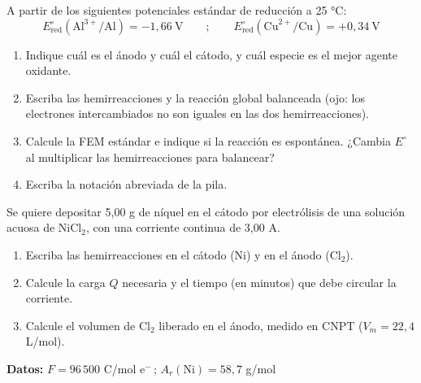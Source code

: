 \documentclass[11pt]{article}
\newcommand{\ejercicio}[1]{\par\vspace{10pt}{\large\bfseries\color{NavyBlue}Ejercicio #1}\par
  \nointerlineskip\vspace{2pt}{\color{NavyBlue!40}\rule{\linewidth}{0.4pt}}\par\vspace{2pt}}
\begin{document}
\ejercicio{6}
A partir de los siguientes potenciales estándar de reducción a 25 °C:
\[E^\circ_{\text{red}}(\text{Al}^{3+}/\text{Al}) = -1{,}66\ \text{V} \qquad ; \qquad E^\circ_{\text{red}}(\text{Cu}^{2+}/\text{Cu}) = +0{,}34\ \text{V}\]
\begin{enumerate}
\item Indique cuál es el ánodo y cuál el cátodo, y cuál especie es el mejor agente oxidante.
\item Escriba las hemirreacciones y la reacción global balanceada (ojo: los electrones intercambiados no son iguales en las dos hemirreacciones).
\item Calcule la FEM estándar e indique si la reacción es espontánea. ¿Cambia \(E^\circ\) al multiplicar las hemirreacciones para balancear?
\item Escriba la notación abreviada de la pila.
\end{enumerate}

\ejercicio{7}
Se quiere depositar 5,00 g de níquel en el cátodo por electrólisis de una solución acuosa de NiCl\(_2\), con una corriente continua de 3,00 A.
\begin{enumerate}
\item Escriba las hemirreacciones en el cátodo (Ni) y en el ánodo (Cl\(_2\)).
\item Calcule la carga \(Q\) necesaria y el tiempo (en minutos) que debe circular la corriente.
\item Calcule el volumen de Cl\(_2\) liberado en el ánodo, medido en CNPT (\(V_m = 22{,}4\) L/mol).
\end{enumerate}
\begin{datos}
\textbf{Datos:} \(F = 96\,500\) C/mol e\(^-\)\,; \(A_r(\text{Ni}) = 58{,}7\) g/mol
\end{datos}
\end{document}
